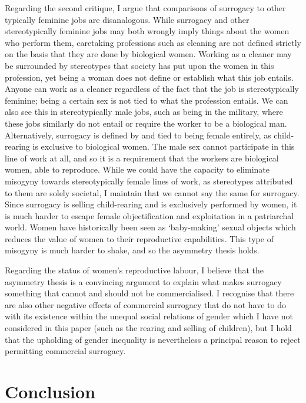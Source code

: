 Regarding the second critique, I argue
that comparisons of surrogacy to other typically feminine jobs are
disanalogous. While surrogacy and other stereotypically feminine jobs
may both wrongly imply things about the women who perform them,
caretaking professions such as cleaning are not defined strictly on the
basis that they are done by biological women. Working as a cleaner may
be surrounded by stereotypes that society has put upon the women in this
profession, yet being a woman does not define or establish what this job
entails. Anyone can work as a cleaner regardless of the fact that the
job is stereotypically feminine; being a certain sex is not tied to what
the profession entails. We can also see this in stereotypically male
jobs, such as being in the military, where these jobs similarly do not
entail or require the worker to be a biological man. Alternatively,
surrogacy is defined by and tied to being female entirely, as child-rearing is exclusive to biological women. The male sex cannot
participate in this line of work at all, and so it is a requirement that
the workers are biological women, able to reproduce. While we could
have the capacity to eliminate misogyny towards stereotypically female
lines of work, as stereotypes attributed to them are solely societal, I
maintain that we cannot say the same for surrogacy. Since surrogacy is
selling child-rearing and is exclusively performed by women, it is much
harder to escape female objectification and exploitation in a
patriarchal world. Women have historically been seen as `baby-making'
sexual objects which reduces the value of women to their reproductive
capabilities. This type of misogyny is much harder to shake, and so the
asymmetry thesis holds. 

Regarding the status of women's reproductive
labour, I believe that the asymmetry thesis is a convincing argument to
explain what makes surrogacy something that cannot and should not be
commercialised. I recognise that there are also other negative effects
of commercial surrogacy that do not have to do with its existence within
the unequal social relations of gender which I have not considered in
this paper (such as the rearing and selling of children), but I hold
that the upholding of gender inequality is nevertheless a principal
reason to reject permitting commercial surrogacy. 

\section*{Conclusion}

